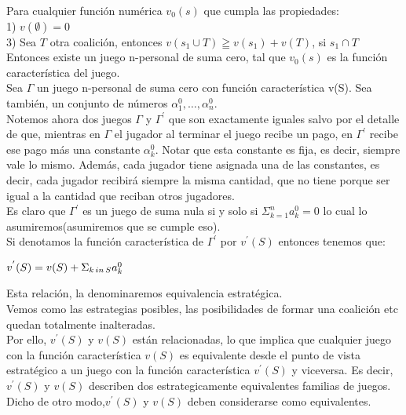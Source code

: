 \documentclass[10pt,a4paper]{book}
\begin{document}
Para cualquier función numérica $v_0(s)$ que cumpla las propiedades:\\
1) $v(\emptyset) = 0$\\
3) Sea $T$ otra coalición, entonces $v(s_1 \cup T) \geqq v(s_1) + v(T)$, si $s_1 \cap T$\\
Entonces existe un juego n-personal de suma cero, tal que $v_0(s)$ es la función característica del juego.\\

Sea $\Gamma$ un juego n-personal de suma cero con función característica v(S). Sea también, un conjunto de números $\alpha^0_1, \ldots, \alpha^0_n$.\\
Notemos ahora dos juegos $\Gamma$ y $\Gamma^{'}$ que son exactamente iguales salvo por el detalle de que, mientras en $\Gamma$ el jugador al terminar el juego recibe un pago, en $\Gamma^{'}$ recibe ese pago más una constante $\alpha^0_k$. Notar que esta constante es fija, es decir, siempre vale lo mismo. Además, cada jugador tiene asignada una de las constantes, es decir, cada jugador recibirá siempre la misma cantidad, que no tiene porque ser igual a la cantidad que reciban otros jugadores.\\
Es claro que $\Gamma^{'}$ es un juego de suma nula si y solo si $\Sigma^n_{k=1} a^0_k=0$ lo cual lo asumiremos(asumiremos que se cumple eso).\\
Si denotamos la función característica de $\Gamma^{'}$ por $v^{'}(S)$ entonces tenemos que:\\

\begin{center}

$v^{'}(S)=v(S)+ \Sigma_{k \thinspace  in \thinspace S}a^0_k$

\end{center}

Esta relación, la denominaremos equivalencia estratégica.\\

Vemos como las estrategias posibles, las posibilidades de formar una coalición etc quedan totalmente inalteradas. \\


Por ello, $v^{'}(S)$ y $v(S)$ están relacionadas, lo que implica que cualquier juego con la función característica $v(S)$ es equivalente desde el punto de vista estratégico a un juego con la función característica $v^{'}(S)$ y viceversa. Es decir, $v^{'}(S)$ y $v(S)$ describen dos estrategicamente equivalentes familias de juegos. Dicho de otro modo,$v^{'}(S)$ y $v(S)$ deben considerarse como equivalentes. \\
\end{document}
